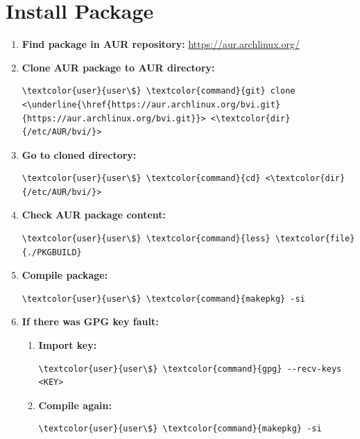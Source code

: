 \documentclass[10pt, a4paper, onecolumn, oneside, titlepage, openany]{book}
\begin{document}
\section{Install Package}
\begin{enumerate}
    \item \textbf{Find package in AUR repository:}
\newline \url{https://aur.archlinux.org/}
    \item \textbf{Clone AUR package to AUR directory:}
\begin{Verbatim}[commandchars=\\\{\}]
\textcolor{user}{user\$} \textcolor{command}{git} clone <\underline{\href{https://aur.archlinux.org/bvi.git}{https://aur.archlinux.org/bvi.git}}> <\textcolor{dir}{/etc/AUR/bvi/}>
\end{Verbatim}
    \item \textbf{Go to cloned directory:}
\begin{Verbatim}[commandchars=\\\{\}]
\textcolor{user}{user\$} \textcolor{command}{cd} <\textcolor{dir}{/etc/AUR/bvi/}>
\end{Verbatim}
    \item \textbf{Check AUR package content:}
\begin{Verbatim}[commandchars=\\\{\}]
\textcolor{user}{user\$} \textcolor{command}{less} \textcolor{file}{./PKGBUILD}
\end{Verbatim}
    \item \textbf{Compile package:}
\begin{Verbatim}[commandchars=\\\{\}]
\textcolor{user}{user\$} \textcolor{command}{makepkg} -si
\end{Verbatim}
    \item \textbf{If there was GPG key fault:}
    \begin{enumerate}
        \item \textbf{Import key:}
\begin{Verbatim}[commandchars=\\\{\}]
\textcolor{user}{user\$} \textcolor{command}{gpg} --recv-keys <KEY>
\end{Verbatim}
        \item \textbf{Compile again:}
\begin{Verbatim}[commandchars=\\\{\}]
\textcolor{user}{user\$} \textcolor{command}{makepkg} -si
\end{Verbatim}
    \end{enumerate}
\end{enumerate}
\end{document}
